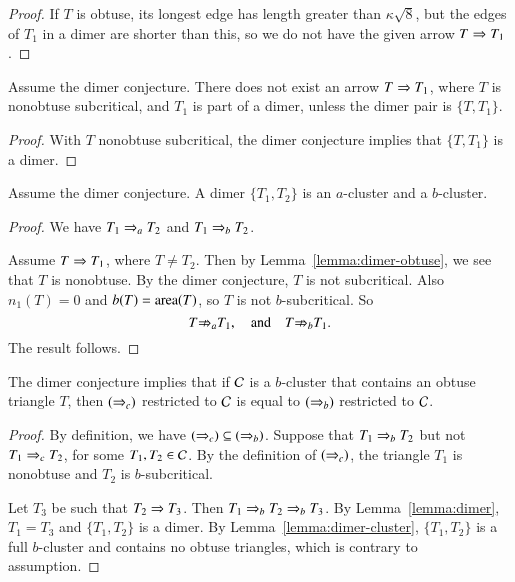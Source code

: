 \begin{proof}  
  If $T$ is obtuse, its longest edge has length greater than
  $\kappa\sqrt8$, but the edges of $T_1$ in a dimer are shorter than
  this, so we do not have the given arrow $T\Rightarrow T_1$.
\end{proof}

\begin{lemma}
  Assume the dimer conjecture.  There does not exist an arrow $T\Rightarrow
  T_1$, where $T$ is nonobtuse subcritical, and $T_1$ is part of a
  dimer, unless the dimer pair is $\{T,T_1\}$.
\end{lemma}


\begin{proof}
  With $T$ nonobtuse subcritical, the dimer conjecture implies that
  $\{T,T_1\}$ is a dimer.
\end{proof}

\begin{lemma}\label{lemma:dimer-cluster}
Assume the dimer conjecture.  A dimer $\{T_1,T_2\}$ is an $a$-cluster and
a $b$-cluster.
\end{lemma}

\begin{proof}  
We have $T_1 \Rightarrow_{a} T_2$ and $T_1 \Rightarrow_{b} T_2$.

Assume $T\Rightarrow T_1$, where $T\ne T_2$.  Then by
Lemma~\ref{lemma:dimer-obtuse}, we see that $T$ is nonobtuse.  By the
dimer conjecture, $T$ is not subcritical.  Also $n_1(T) = 0$ and
$b(T)={\operatorname{area}}(T)$, so $T$ is not $b$-subcritical.  So
\[
T{\not\Rightarrow}_{a} T_1,\quad\text{and}\quad T{\not\Rightarrow}_{b} T_1.
\]
The result follows.
\end{proof}



\begin{lemma}\label{lemma:b=c}  
The dimer conjecture implies that if $\mathcal C$ is a $b$-cluster
that contains an obtuse triangle $T$, then $(\Rightarrow_{c})$ restricted to $\mathcal C$ is
equal to $(\Rightarrow_{b})$ restricted to $\mathcal C$.
\end{lemma}

\begin{proof} By definition, we have $(\Rightarrow_{c})\subseteq (\Rightarrow_{b})$.
  Suppose that $T_1\Rightarrow_{b} T_2$ but not $T_1 \Rightarrow_{c} T_2$, for some
  $T_1,T_2\in\mathcal C$.  By the definition of $(\Rightarrow_{c})$, the triangle $T_1$
  is nonobtuse and $T_2$ is $b$-subcritical.

  Let $T_3$ be such that $T_2\Rightarrow T_3$.  Then $T_1\Rightarrow_{b} T_2\Rightarrow_{b}
  T_3$.  By Lemma~\ref{lemma:dimer}, $T_1=T_3$ and $\{T_1,T_2\}$ is a
  dimer.  By Lemma~\ref{lemma:dimer-cluster}, $\{T_1,T_2\}$ is a full
  $b$-cluster and contains no obtuse triangles, which is contrary to
  assumption.
\end{proof}

